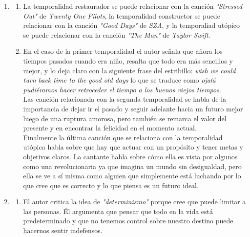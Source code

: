 \documentclass[10pt, a4paper]{article}
\begin{document}
    \begin{enumerate}

      \item \begin{enumerate}
          \item La temporalidad restaurador se puede relacionar con la canción 
            \textit{"Stressed Out"} de \textit{Twenty One Pilots}, la temporalidad constructor 
            se puede relacionar con la canción \textit{"Good Days"} de 
            \textit{SZA}, y la temporaliad utópico se puede relacionar 
            con la canción \textit{"The Man"} de \textit{Taylor Swift}.
        \item En el caso de la primer temporalidad el autor señala que añora los
          tiempos pasados cuando era niño, resalta que todo era más sencillos y
          mejor, y lo deja claro con la siguiente frase del estribillo:
          \textit{wish we could turn back time to the good old days} lo que se 
          traduce como \textit{ojalá pudiéramos hacer retroceder el tiempo a 
          los buenos viejos tiempos}.\\
          Las canción relacionada con la segunda temporalidad se habla de la 
          importancia de dejar ir el pasado y seguir adelante hacia un futuro 
          mejor luego de una ruptura amorosa, pero también se remarca el 
          valor del presente y en encontrar la felicidad en el momento actual.\\
          Finalmente la última canción que se relaciona con la temporalidad utópica
          habla sobre que hay que actuar con un propósito y tener metas y 
          objetivos claros. La cantante habla sobre cómo ella es 
          vista por algunos como una revolucionaria ya que imagina un mundo 
          sin desigualdad,
          pero ella se ve a sí  misma como alguien que simplemente está luchando 
          por lo que cree que es correcto y lo que piensa es un futuro ideal.
      \end{enumerate} 

      \item \begin{enumerate}

        \item El autor critica la idea de \textit{"determinismo"} porque cree que 
          puede limitar a las personas. Él argumenta que pensar que todo en la 
          vida está predeterminado y que no tenemos control sobre nuestro destino 
          puede hacernos sentir indefensos. \\


\end{enumerate}
\end{enumerate}
\end{document}
